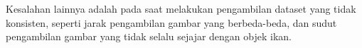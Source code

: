 Kesalahan lainnya adalah pada saat melakukan pengambilan dataset yang tidak konsisten, seperti jarak pengambilan gambar yang berbeda-beda, dan sudut pengambilan gambar yang tidak selalu sejajar dengan objek ikan.

